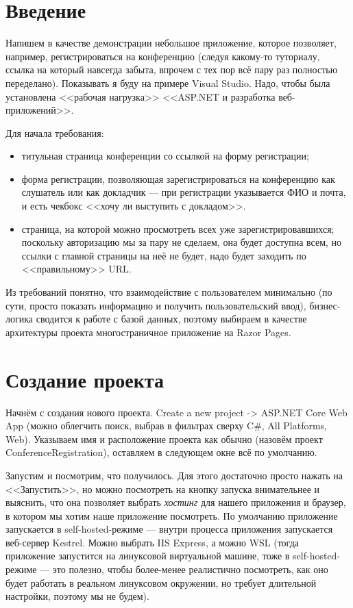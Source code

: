 \documentclass{../../text-style}
\begin{document}
\maketitle
\thispagestyle{empty}

\section{Введение}

Напишем в качестве демонстрации небольшое приложение, которое позволяет, например, регистрироваться на конференцию (следуя какому-то туториалу, ссылка на который навсегда забыта, впрочем с тех пор всё пару раз полностью переделано). Показывать я буду на примере Visual Studio. Надо, чтобы была установлена <<рабочая нагрузка>> <<ASP.NET и разработка веб-приложений>>.

Для начала требования:

\begin{itemize}
    \item титульная страница конференции со ссылкой на форму регистрации;
    \item форма регистрации, позволяющая зарегистрироваться на конференцию как слушатель или как докладчик --- при регистрации указывается ФИО и почта, и есть чекбокс <<хочу ли выступить с докладом>>.
    \item страница, на которой можно просмотреть всех уже зарегистрировавшихся; поскольку авторизацию мы за пару не сделаем, она будет доступна всем, но ссылки с главной страницы на неё не будет, надо будет заходить по <<правильному>> URL.
\end{itemize}

Из требований понятно, что взаимодействие с пользователем минимально (по сути, просто показать информацию и получить пользовательский ввод), бизнес-логика сводится к работе с базой данных, поэтому выбираем в качестве архитектуры проекта многостраничное приложение на Razor Pages.

\section{Создание проекта}

Начнём с создания нового проекта. Create a new project -> ASP.NET Core Web App (можно облегчить поиск, выбрав в фильтрах сверху C\#, All Platforms, Web). Указываем имя и расположение проекта как обычно (назовём проект ConferenceRegistration), оставляем в следующем окне всё по умолчанию.

Запустим и посмотрим, что получилось. Для этого достаточно просто нажать на <<Запустить>>, но можно посмотреть на кнопку запуска внимательнее и выяснить, что она позволяет выбрать \textit{хостинг} для нашего приложения и браузер, в котором мы хотим наше приложение посмотреть. По умолчанию приложение запускается в self-hosted-режиме --- внутри процесса приложения запускается веб-сервер Kestrel. Можно выбрать IIS Express, а можно WSL (тогда приложение запустится на линуксовой виртуальной машине, тоже в self-hosted-режиме --- это полезно, чтобы более-менее реалистично посмотреть, как оно будет работать в реальном линуксовом окружении, но требует длительной настройки, поэтому мы не будем). 
\end{document}
